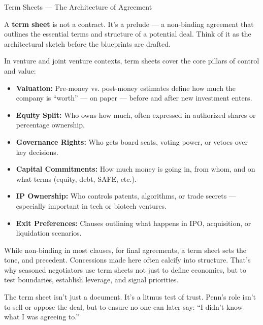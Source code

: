 \begin{TechnicalSidebar}{Term Sheets — The Architecture of Agreement}

  A \textbf{term sheet} is not a contract. It’s a prelude — a non-binding agreement that outlines the essential terms 
  and structure of a potential deal. Think of it as the architectural sketch before the blueprints are drafted.
  
  \medskip
  
  In venture and joint venture contexts, term sheets cover the core pillars of control and value:

  \medskip
  
  \begin{itemize}
    \item \textbf{Valuation:} Pre-money vs. post-money estimates define how much the company is “worth” — on paper — 
    before and after new investment enters.
    \item \textbf{Equity Split:} Who owns how much, often expressed in authorized shares or percentage ownership.
    \item \textbf{Governance Rights:} Who gets board seats, voting power, or vetoes over key decisions.
    \item \textbf{Capital Commitments:} How much money is going in, from whom, and on what terms (equity, debt, SAFE, etc.).
    \item \textbf{IP Ownership:} Who controls patents, algorithms, or trade secrets — especially important in tech or 
    biotech ventures.
    \item \textbf{Exit Preferences:} Clauses outlining what happens in IPO, acquisition, or liquidation scenarios.
  \end{itemize}
  
  \medskip
  
  While non-binding in most clauses, for final agreements, a term sheet sets the tone, and precedent. Concessions made 
  here often calcify into structure. That’s why seasoned negotiators use term sheets not just to define economics, but to 
  test boundaries, establish leverage, and signal priorities.
  
  \medskip
  
  The term sheet isn’t just a document. It’s a litmus test of trust. Penn’s role isn’t to sell 
  or oppose the deal, but to ensure no one can later say: ``I didn’t know what I was agreeing to.''
  
\end{TechnicalSidebar}

